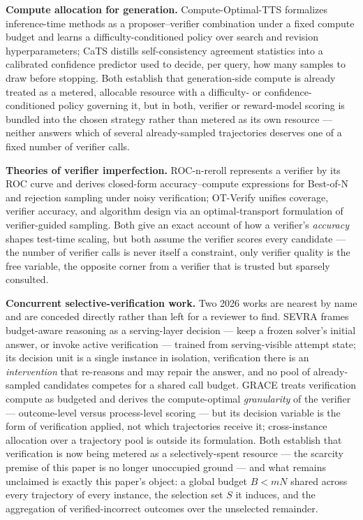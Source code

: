 \documentclass[11pt]{article}
\begin{document}
\textbf{Compute allocation for generation.} Compute-Optimal-TTS \citep{ComputeOptTTS2607} formalizes inference-time methods as a proposer--verifier combination under a fixed compute budget and learns a difficulty-conditioned policy over search and revision hyperparameters; CaTS \citep{CaTS2607} distills self-consistency agreement statistics into a calibrated confidence predictor used to decide, per query, how many samples to draw before stopping. Both establish that generation-side compute is already treated as a metered, allocable resource with a difficulty- or confidence-conditioned policy governing it, but in both, verifier or reward-model scoring is bundled into the chosen strategy rather than metered as its own resource --- neither answers which of several already-sampled trajectories deserves one of a fixed number of verifier calls.

\textbf{Theories of verifier imperfection.} ROC-n-reroll \citep{ROCnReroll2607} represents a verifier by its ROC curve and derives closed-form accuracy--compute expressions for Best-of-N and rejection sampling under noisy verification; OT-Verify \citep{OTVerify2607} unifies coverage, verifier accuracy, and algorithm design via an optimal-transport formulation of verifier-guided sampling. Both give an exact account of how a verifier's \emph{accuracy} shapes test-time scaling, but both assume the verifier scores every candidate --- the number of verifier calls is never itself a constraint, only verifier quality is the free variable, the opposite corner from a verifier that is trusted but sparsely consulted.

\textbf{Concurrent selective-verification work.} Two 2026 works are nearest by name and are conceded directly rather than left for a reviewer to find. SEVRA \citep{SEVRA2026} frames budget-aware reasoning as a serving-layer decision --- keep a frozen solver's initial answer, or invoke active verification --- trained from serving-visible attempt state; its decision unit is a single instance in isolation, verification there is an \emph{intervention} that re-reasons and may repair the answer, and no pool of already-sampled candidates competes for a shared call budget. GRACE \citep{GRACE2026} treats verification compute as budgeted and derives the compute-optimal \emph{granularity} of the verifier --- outcome-level versus process-level scoring --- but its decision variable is the form of verification applied, not which trajectories receive it; cross-instance allocation over a trajectory pool is outside its formulation. Both establish that verification is now being metered as a selectively-spent resource --- the scarcity premise of this paper is no longer unoccupied ground --- and what remains unclaimed is exactly this paper's object: a global budget $B < mN$ shared across every trajectory of every instance, the selection set $S$ it induces, and the aggregation of verified-incorrect outcomes over the unselected remainder.
\end{document}
